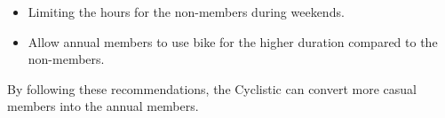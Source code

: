 \documentclass[
]{article}
\providecommand{\tightlist}{%
  \setlength{\itemsep}{0pt}\setlength{\parskip}{0pt}}
\begin{document}
\begin{itemize}
\tightlist
\item
  Limiting the hours for the non-members during weekends.
\item
  Allow annual members to use bike for the higher duration compared to
  the non-members.
\end{itemize}

By following these recommendations, the Cyclistic can convert more
casual members into the annual members.
\end{document}
